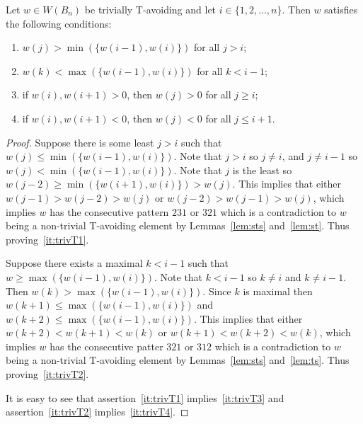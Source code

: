 \begin{lemma}\label{lem:prodofCommB}
Let $w \in W(B_n)$ be trivially T-avoiding and let $i \in \{1,2, \ldots, n\}$. Then $w$ satisfies the following conditions:
\begin{enumerate}
\item $w(j) > \min(\{w(i-1), w(i)\})$ for all $j >i$;\label{it:trivT1}
\item $w(k) < \max(\{w(i-1), w(i)\})$ for all $k < i-1$;\label{it:trivT2}
\item if $w(i), w(i+1) > 0$, then $w(j)>0$ for all $j \geq i$;\label{it:trivT3}
\item if $w(i), w(i+1) < 0$, then $w(j)<0$ for all $j \leq i+1$.\label{it:trivT4}
\end{enumerate}
\begin{proof}
	Suppose there is some least $j>i$ such that $w(j) \leq \min(\{w(i-1), w(i)\})$. Note that $j>i$ so $j \neq i$, and $j \neq i-1$ so $w(j) < \min(\{w(i-1), w(i)\})$. Note that $j$ is the least so $w(j-2) \geq \min(\{w(i+1), w(i)\})>w(j)$. This implies that either $w(j-1)>w(j-2)>w(j)$ or $w(j-2)>w(j-1)>w(j)$, which implies $w$ has the consecutive pattern $231$ or $321$ which is a contradiction to $w$ being a non-trivial T-avoiding element by Lemmas~\ref{lem:sts} and~\ref{lem:st}. Thus proving~\ref{it:trivT1}.
	
	Suppose there exists a maximal $k<i-1$ such that $w \geq \max(\{w(i-1), w(i)\})$. Note that $k < i-1$ so $k \neq i$ and $k \neq i-1$. Then $w(k)> \max(\{w(i-1), w(i)\})$. Since $k$ is maximal then $w(k+1) \leq  \max(\{w(i-1), w(i)\})$ and $w(k+2) \leq \max(\{w(i-1), w(i)\})$. This implies that either $w(k+2)<w(k+1)<w(k)$ or $w(k+1)<w(k+2)<w(k)$, which implies $w$ has the consecutive patter $321$ or $312$ which is a contradiction to $w$ being a non-trivial T-avoiding element by Lemmas~\ref{lem:sts} and~\ref{lem:ts}. Thus proving~\ref{it:trivT2}.
	
	It is easy to see that assertion~\ref{it:trivT1} implies~\ref{it:trivT3} and assertion~\ref{it:trivT2} implies~\ref{it:trivT4}.
\end{proof}	
\end{lemma}

